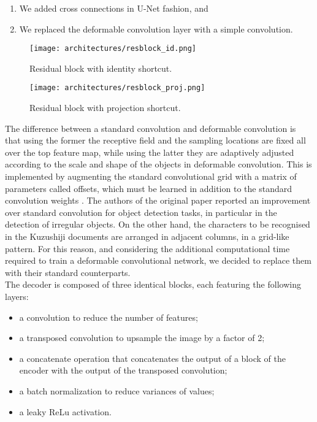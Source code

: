 \begin{enumerate}
	\item We added cross connections in U-Net fashion, and
	\item We replaced the deformable convolution layer with a simple convolution.
\end{enumerate}

\begin{figure}
	\caption{Residual block with identity shortcut.}
	\centering
	\texttt{[image: architectures/resblock\_id.png]}
	\label{fig:resblock-id}
\end{figure}

\begin{figure}
	\caption{Residual block with projection shortcut.}
	\centering
	\texttt{[image: architectures/resblock\_proj.png]}
	\label{fig:resblock-proj}
\end{figure}

The difference between a standard convolution and deformable convolution is that using the former the receptive field and the sampling locations are fixed all over the top feature map, while using the latter they are adaptively adjusted according to the scale and shape of the objects in deformable convolution. This is implemented by augmenting the standard convolutional grid with a matrix of parameters called offsets, which must be learned in addition to the standard convolution weights \cite{DeformableConv2017}. The authors of the original paper reported an improvement over standard convolution for object detection tasks, in particular in the detection of irregular objects. On the other hand, the characters to be recognised in the Kuzushiji documents are arranged in adjacent columns, in a grid-like pattern. For this reason, and considering the additional computational time required to train a deformable convolutional network, we decided to replace them with their standard counterparts. \\

The decoder is composed of three identical blocks, each featuring the following layers:

\begin{itemize}
	\item a convolution to reduce the number of features;
	\item a transposed convolution to upsample the image by a factor of 2;
	\item a concatenate operation that concatenates the output of a block of the encoder with the output of the transposed convolution;
	\item a batch normalization to reduce variances of values;
	\item a leaky ReLu activation.
\end{itemize}

